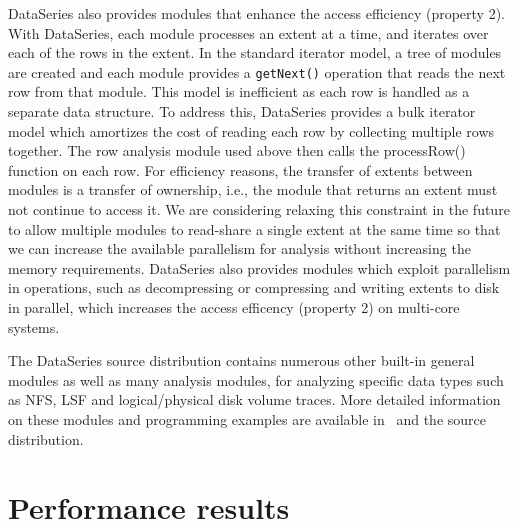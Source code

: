 \documentclass{acm_proc_article-sp}
\begin{document}
DataSeries also provides modules that enhance the access efficiency
(property 2).
With DataSeries, each module processes an extent at a time, and
iterates over each of the rows in the extent.  In the standard
iterator model, a tree of modules are created and each module provides
a {\tt getNext()} operation that reads the next row from that module.
This model is inefficient as each row is handled as a separate data
structure.  To address this, DataSeries provides a 
bulk iterator model which amortizes the cost of reading each
row by collecting multiple rows together.  The row analysis module
used above then calls the processRow() function on each row.  For
efficiency reasons, the transfer of extents between modules is a
transfer of ownership, i.e., the module that returns an extent must
not continue to access it. We are considering relaxing this
constraint in the future to allow multiple modules to read-share a single
extent at the same time so that we can increase the available parallelism
for analysis without increasing the memory requirements.
DataSeries also provides modules which exploit parallelism in operations,
such as decompressing or compressing and writing
extents to disk in parallel, which increases the access efficency
(property 2) on multi-core systems.

The DataSeries source distribution contains numerous other built-in 
general modules as well as many analysis modules, for analyzing
specific data types such as NFS, LSF and logical/physical disk volume
traces.  More detailed information on these modules and programming
examples are available 
in~\cite{DSTechnicalReportSnapshot} and the source distribution.

\section{Performance results}\label{sec:results}

\end{document}
